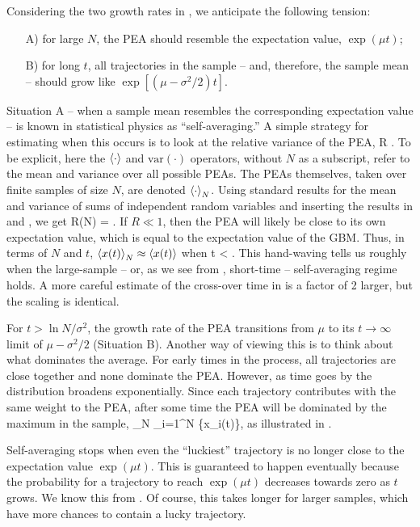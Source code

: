 Considering the two growth rates in , we anticipate the following tension:
\begin{enumerate}
\item[A)] for large $N$, the PEA should resemble the expectation value, $\exp(\mu t)$;
\item[B)] for long $t$, all trajectories in the sample -- and, therefore, the sample mean -- should grow like $\exp[(\mu-\sigma^2/2)t]$.
\end{enumerate}
Situation A -- when a sample mean resembles the corresponding expectation value -- is known in statistical physics as ``self-averaging.'' A simple strategy for estimating when this occurs is to look at the relative variance of the PEA,
\be
R \equiv {}.
\ee
To be explicit, here the $\left\langle\cdot \right\rangle$ and $\text{var}(\cdot)$ operators, 
without $N$ as a subscript, 
refer to the mean and variance over all possible PEAs. The PEAs themselves, taken over finite samples of size $N$, are denoted $\left\langle\cdot \right\rangle_N$. Using standard results for the mean and variance of sums of independent random variables and inserting the results in  and , we get
\be
R(N) = .
\ee
If $R \ll 1$, then the PEA will likely be close to its own expectation value, which is equal to the expectation value of the GBM. Thus, in terms of $N$ and $t$, $\left\langle x(t) \right\rangle_N\approx\left\langle x(t) \right\rangle$ when
\be
t < .
\ee
This hand-waving tells us roughly when the large-sample -- or, as we see from , short-time -- self-averaging regime holds. A more careful estimate of the cross-over time in  is a factor of 2 larger, but the scaling is identical.

For $t>\ln N/\sigma^2$, the growth rate of the PEA transitions from $\mu$ to its $t\to\infty$ limit of $\mu-\sigma^2/2$ (Situation B). 
Another way of viewing this is to think about what dominates the average. For early times in the process, all trajectories are close together and none dominate the PEA. However, as time goes by the distribution broadens exponentially. Since each trajectory contributes with the same weight to the PEA, after some time the PEA will be dominated by the maximum in the sample,
\be
{}_N \approx {}\max_{i=1}^N \{x_i(t)\},
\ee
as illustrated in .

Self-averaging stops when even the ``luckiest'' trajectory is no longer close to the expectation value $\exp(\mu t)$. This is guaranteed to happen eventually because the probability for a trajectory to reach $\exp(\mu t)$ decreases towards zero as $t$ grows. We know this from . Of course, this takes longer for larger samples, which have more chances to contain a lucky trajectory. 

